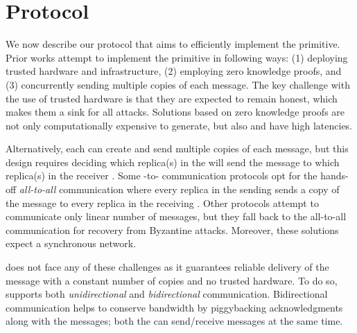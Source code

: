 \section{\Shadow{} Protocol}
\label{s:algo}
We now describe our \Scrooge{} protocol that aims to efficiently implement the \CCC{} primitive.
Prior works attempt to implement the \CCC{} primitive in following ways:
(1) deploying trusted hardware and infrastructure,
(2) employing zero knowledge proofs, and
(3) concurrently sending multiple copies of each message.
The key challenge with the use of trusted hardware is that they 
are expected to remain honest, which makes them a sink for all attacks.
Solutions based on zero knowledge proofs 
are not only computationally expensive to generate, but also  and have high latencies.

Alternatively, each \RSM{} can create and send multiple copies of each message, 
but this design requires deciding which replica(s) in the \RSM{} will send the message to 
which replica(s) in the receiver \RSM{}.
Some \RSM{}-to-\RSM{} communication protocols opt for the hands-off {\em all-to-all} communication 
where every replica in the sending \RSM{} sends a copy of the message to every replica in the receiving \RSM{}.
Other protocols attempt to communicate only linear number of messages, but they 
fall back to the all-to-all communication for recovery from Byzantine attacks.
Moreover, these solutions expect a synchronous network.

\Scrooge{} does not face any of these challenges as it guarantees reliable delivery of the message 
with a constant number of copies and no trusted hardware.
To do so, \Scrooge{} supports both {\em unidirectional} and {\em bidirectional} communication.
Bidirectional communication helps to conserve bandwidth by piggybacking acknowledgments along with the messages; 
both the  can send/receive messages at the same time.


